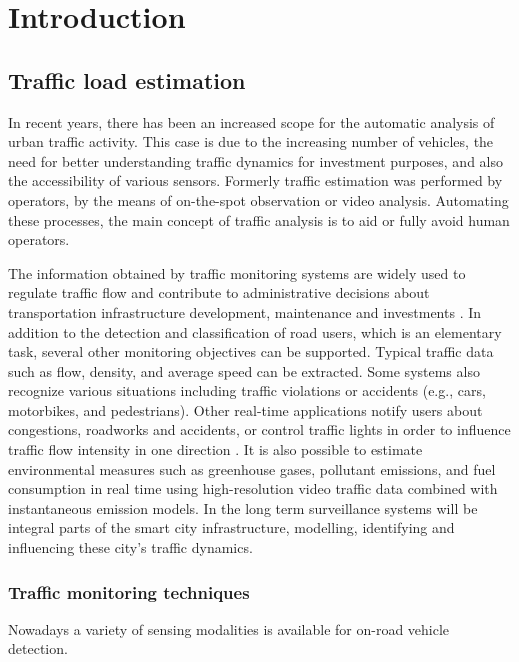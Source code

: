 \chapter*{Introduction}
\section{Traffic load estimation}
In recent years, there has been an increased scope for the automatic analysis of urban traffic activity\cite{Buch2011}.
This case is due to the increasing number of vehicles, the need for better understanding traffic dynamics for investment purposes, and also the accessibility of various sensors.
Formerly traffic estimation was performed by operators, by the means of on-the-spot observation or video analysis.
Automating these processes, the main concept of traffic analysis is to aid or fully avoid human operators.

The information obtained by traffic monitoring systems are widely used to regulate traffic flow and contribute to administrative decisions about transportation infrastructure development, maintenance and investments \cite{MagyarKozut}.
In addition to the detection and classification of road users, which is an elementary task, several other monitoring objectives can be supported. 
Typical traffic data such as flow, density, and average speed can be extracted.
Some systems also recognize various situations including traffic violations or accidents (e.g., cars, motorbikes, and pedestrians).
Other real-time applications notify users about congestions, roadworks and accidents, or control traffic lights in order to influence traffic flow intensity in one direction \cite{AzoSensor, Thiruverahan2015, Ghazal2016}.
It is also possible to estimate environmental measures such as greenhouse gases, pollutant emissions, and fuel consumption in real time using high-resolution video traffic data combined with instantaneous emission models\cite{Morris2012a}. 
In the long term surveillance systems will be integral parts of the smart city infrastructure, modelling, identifying and influencing these city's traffic dynamics\cite{SOLSUN}.

\subsection{Traffic monitoring techniques}
Nowadays a variety of sensing modalities is available for on-road vehicle detection.

